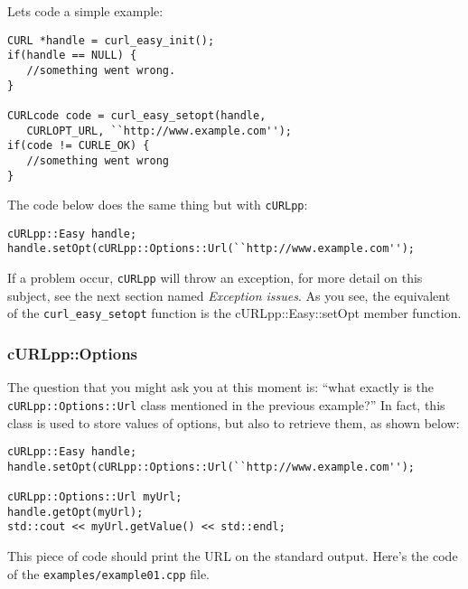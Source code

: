 \documentclass{article}
\begin{document}
Lets code a simple example:

\begin{verbatim}
CURL *handle = curl_easy_init();
if(handle == NULL) {
   //something went wrong.
}

CURLcode code = curl_easy_setopt(handle, 
   CURLOPT_URL, ``http://www.example.com'');
if(code != CURLE_OK) {
   //something went wrong
}
\end{verbatim}
The code below does the same thing but with \verb+cURLpp+:

\begin{verbatim}
cURLpp::Easy handle;
handle.setOpt(cURLpp::Options::Url(``http://www.example.com'');
\end{verbatim}

If a problem occur, \verb+cURLpp+ will throw an exception, for more detail on this subject,
see the next section named \textit{Exception issues}. As you see, the equivalent
of the \verb+curl_easy_setopt+ function is the cURLpp::Easy::setOpt member function.

\subsubsection{cURLpp::Options}

The question that you might ask you at this moment is: ``what exactly is the 
\verb+cURLpp::Options::Url+ class mentioned in the previous example?'' In fact, 
this class is used to store values of options, but also to retrieve them, as shown
below:

\begin{verbatim}
cURLpp::Easy handle;
handle.setOpt(cURLpp::Options::Url(``http://www.example.com'');

cURLpp::Options::Url myUrl;
handle.getOpt(myUrl);
std::cout << myUrl.getValue() << std::endl;
\end{verbatim}

This piece of code should print the URL on the standard output. Here's the
code of the \verb+examples/example01.cpp+ file.
\end{document}
